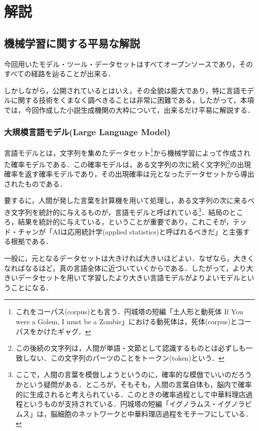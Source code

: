 \documentclass[10pt, a5paper, twoside]{jsarticle}
\theoremstyle{definition}
\begin{document}
	\clearpage

	\section{解説}

		\subsection{機械学習に関する平易な解説}

			今回用いたモデル・ツール・データセットはすべてオープンソースであり，そのすべての経路を辿ることが出来る．

			しかしながら，公開されているとはいえ，その全貌は膨大であり，特に言語モデルに関する技術をくまなく調べきることは非常に困難である，したがって，本項では，今回作成した小説生成機関の大枠について，出来るだけ平易に解説する．

			\subsubsection{大規模言語モデル(Large Language Model)}

				言語モデルとは，文字列を集めたデータセット\footnote{これをコーパス(corpus)とも言う．円城塔の短編「土人形と動死体 If You were a Golem, I must be a Zombie」における動死体は，死体(corpus)とコーパスをかけたギャグ．}から機械学習によって作成された確率モデルである．この確率モデルは，ある文字列の次に続く文字列\footnote{この後続の文字列は，人間が単語・文節として認識するものとは必ずしも一致しない．この文字列のパーツのことをトークン(token)という．}の出現確率を返す確率モデルであり，その出現確率は元となったデータセットから導出されたものである．

				要するに，人間が発した言葉を計算機を用いて処理し，ある文字列の次に来るべき文字列を統計的に与えるものが，言語モデルと呼ばれている\footnote{ここで，人間の言葉を模倣しようというのに，確率的な模倣でいいのだろうかという疑問がある．ところが，そもそも，人間の言葉自体も，脳内で確率的に生成されると考えられている．このときの確率過程として中華料理店過程というものが支持されている．円城塔の短編「イグノラムス・イグノラビムス」は，脳細胞のネットワークと中華料理店過程をモチーフにしている．}．結局のところ，結果を統計的に与えている，ということが重要であり，これこそが，テッド・チャンが「AIは応用統計学(applied statistics)と呼ばれるべきだ」\cite{ted}と主張する根拠である．

				一般に，元となるデータセットは大きければ大きいほどよい．なぜなら，大きくなればなるほど，真の言語全体に近づいていくからである．したがって，より大きいデータセットを用いて学習したより大きい言語モデルがよりよいモデルということになる．
\end{document}
